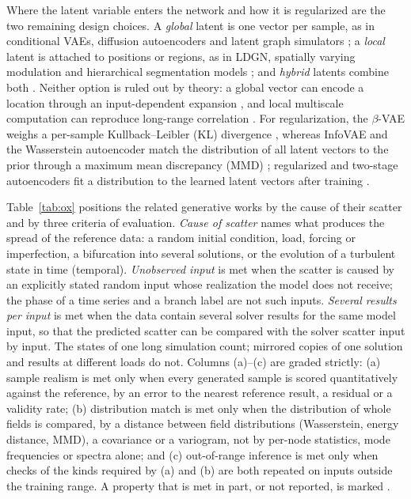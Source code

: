 \documentclass[preprint,12pt]{elsarticle}
\newcommand{\no}{\ding{55}}
\begin{document}
Where the latent variable enters the network and how it is regularized are the two remaining
design choices. A \emph{global} latent is one vector per sample, as in conditional VAEs, diffusion
autoencoders \cite{preechakul2022diffae} and latent graph simulators
\cite{dahlinger2023ltsgns,nath2026uresvgae}; a \emph{local} latent is attached to positions or
regions, as in LDGN, spatially varying modulation \cite{park2019spade,zhu2020sean,tan2021inade}
and hierarchical segmentation models \cite{kohl2019hpunet,baumgartner2019phiseg}; and
\emph{hybrid} latents combine both \cite{yang2019pointflow,zeng2022lion,xie2026dualdiff}. Neither
option is ruled out by theory: a global vector can encode a location through an input-dependent
expansion \cite{park2026dll}, and local multiscale computation can reproduce long-range
correlation \cite{masuki2026rgfm}. For regularization, the $\beta$-VAE weighs a per-sample
Kullback--Leibler (KL) divergence \cite{higgins2017beta}, whereas InfoVAE and the Wasserstein
autoencoder match the distribution of all latent vectors to the prior through a maximum mean
discrepancy (MMD) \cite{zhao2019infovae,tolstikhin2018wae,gretton2012kernel}; regularized and
two-stage autoencoders fit a distribution to the learned latent vectors after training
\cite{ghosh2020rae,dai2019diagnosing}.

Table~\ref{tab:ox} positions the related generative works by the cause of their scatter and by
three criteria of evaluation. \emph{Cause of scatter} names what produces the spread of the
reference data: a random initial condition, load, forcing or imperfection, a bifurcation into
several solutions, or the evolution of a turbulent state in time (temporal). \emph{Unobserved
input} is met when the scatter is caused by an explicitly stated random input whose realization
the model does not receive; the phase of a time series and a branch label are not such inputs.
\emph{Several results per input} is met when the data contain several solver results for the
same model input, so that the predicted scatter can be compared with the solver scatter input by
input. The states of one long simulation count; mirrored copies of one solution and results at
different loads do not. Columns (a)--(c) are graded strictly: (a) sample realism is met only when
every generated sample is scored quantitatively against the reference, by an error to the
nearest reference result, a residual or a validity rate; (b) distribution match is met only when
the distribution of whole fields is compared, by a distance between field distributions
(Wasserstein, energy distance, MMD), a covariance or a variogram, not by per-node statistics,
mode frequencies or spectra alone; and (c) out-of-range inference is met only when checks of the
kinds required by (a) and (b) are both repeated on inputs outside the training range. A property
that is met in part, or not reported, is marked \no.
\end{document}
